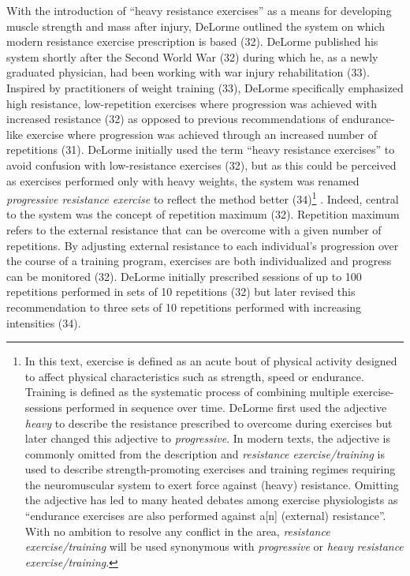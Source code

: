 \documentclass[twoside,10pt]{gihclass} %
\begin{document}
With the introduction of ``heavy resistance exercises'' as a means for developing muscle strength and mass after injury, DeLorme outlined the system on which modern resistance exercise prescription is based (32).
DeLorme published his system shortly after the Second World War (32)
during which he, as a newly graduated physician, had been working with war injury rehabilitation
(33).
Inspired by practitioners of weight training (33),
DeLorme specifically emphasized high resistance, low-repetition exercises where progression was achieved with increased resistance (32) as opposed to previous recommendations of endurance-like exercise where progression was achieved through an increased number of repetitions
(31).
DeLorme initially used the term ``heavy resistance exercises'' to avoid confusion with low-resistance exercises (32), but as this could be perceived as exercises performed only with heavy weights, the system was renamed \emph{progressive resistance exercise} to reflect the method better
(34)\footnote{In this text, exercise is defined as an acute bout of physical activity designed to affect physical characteristics such as strength, speed or endurance. Training is defined as the systematic process of combining multiple exercise-sessions performed in sequence over time. DeLorme first used the adjective \emph{heavy} to describe the resistance prescribed to overcome during exercises but later changed this adjective to \emph{progressive}. In modern texts, the adjective is commonly omitted from the description and \emph{resistance exercise/training} is used to describe strength-promoting exercises and training regimes requiring the neuromuscular system to exert force against (heavy) resistance. Omitting the adjective has led to many heated debates among exercise physiologists as ``endurance exercises are also performed against a{[}n{]} (external) resistance''. With no ambition to resolve any conflict in the area, \emph{resistance exercise/training} will be used synonymous with \emph{progressive} or \emph{heavy} \emph{resistance exercise/training}.}
.
Indeed, central to the system was the concept of repetition maximum (32).
Repetition maximum refers to the external resistance that can be overcome with a given number of repetitions.
By adjusting external resistance to each individual's progression over the course of a training program, exercises are both individualized and progress can be monitored (32).
DeLorme initially prescribed sessions of up to 100 repetitions performed in sets of 10 repetitions (32) but later revised this recommendation to three sets of 10 repetitions performed with increasing intensities
(34).
\end{document}
